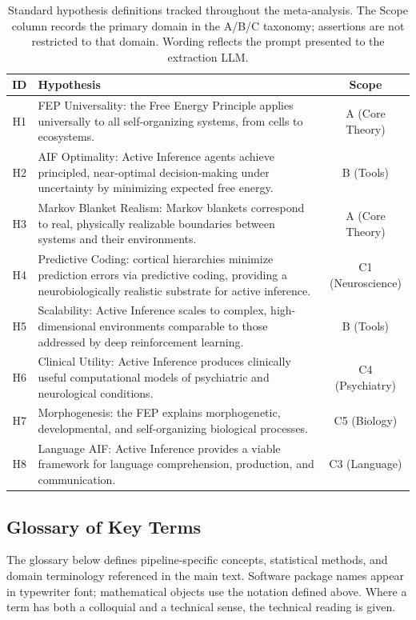 \documentclass[
  english,
]{article}
\begin{document}
\begin{table}[H]
\centering
\caption{Standard hypothesis definitions tracked throughout the meta-analysis. The Scope column records the primary domain in the A/B/C taxonomy; assertions are not restricted to that domain. Wording reflects the prompt presented to the extraction LLM.}
\label{tab:hypothesis_definitions}
\begin{tabular}{cp{8cm}c}
\toprule
\textbf{ID} & \textbf{Hypothesis} & \textbf{Scope} \\
\midrule
H1 & FEP Universality: the Free Energy Principle applies universally to all self-organizing systems, from cells to ecosystems. & A (Core Theory) \\
H2 & AIF Optimality: Active Inference agents achieve principled, near-optimal decision-making under uncertainty by minimizing expected free energy. & B (Tools) \\
H3 & Markov Blanket Realism: Markov blankets correspond to real, physically realizable boundaries between systems and their environments. & A (Core Theory) \\
H4 & Predictive Coding: cortical hierarchies minimize prediction errors via predictive coding, providing a neurobiologically realistic substrate for active inference. & C1 (Neuroscience) \\
H5 & Scalability: Active Inference scales to complex, high-dimensional environments comparable to those addressed by deep reinforcement learning. & B (Tools) \\
H6 & Clinical Utility: Active Inference produces clinically useful computational models of psychiatric and neurological conditions. & C4 (Psychiatry) \\
H7 & Morphogenesis: the FEP explains morphogenetic, developmental, and self-organizing biological processes. & C5 (Biology) \\
H8 & Language AIF: Active Inference provides a viable framework for language comprehension, production, and communication. & C3 (Language) \\
\bottomrule
\end{tabular}
\end{table}

\FloatBarrier

\subsection{Glossary of Key Terms}\label{glossary-of-key-terms}

The glossary below defines pipeline-specific concepts, statistical
methods, and domain terminology referenced in the main text. Software
package names appear in typewriter font; mathematical objects use the
notation defined above. Where a term has both a colloquial and a
technical sense, the technical reading is given.
\end{document}
